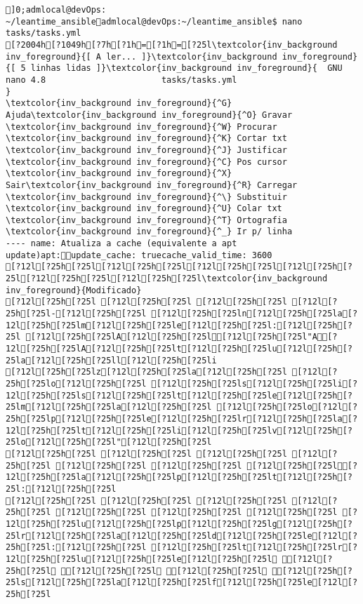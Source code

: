 \documentclass{scrartcl}
\title{}
\begin{document}
\begin{Verbatim}
]0;admlocal@devOps: ~/leantime_ansibleadmlocal@devOps:~/leantime_ansible$ nano tasks/tasks.yml 
[?2004h[?1049h[?7h[?1h=[?1h=[?25l\textcolor{inv_background inv_foreground}{[ A ler... ]}\textcolor{inv_background inv_foreground}{[ 5 linhas lidas ]}\textcolor{inv_background inv_foreground}{  GNU nano 4.8                       tasks/tasks.yml                                   }
\textcolor{inv_background inv_foreground}{^G} Ajuda\textcolor{inv_background inv_foreground}{^O} Gravar     \textcolor{inv_background inv_foreground}{^W} Procurar   \textcolor{inv_background inv_foreground}{^K} Cortar txt \textcolor{inv_background inv_foreground}{^J} Justificar \textcolor{inv_background inv_foreground}{^C} Pos cursor
\textcolor{inv_background inv_foreground}{^X} Sair\textcolor{inv_background inv_foreground}{^R} Carregar   \textcolor{inv_background inv_foreground}{^\} Substituir \textcolor{inv_background inv_foreground}{^U} Colar txt  \textcolor{inv_background inv_foreground}{^T} Ortografia \textcolor{inv_background inv_foreground}{^_} Ir p/ linha
---- name: Atualiza a cache (equivalente a apt update)apt:update_cache: truecache_valid_time: 3600
[?12l[?25h[?25l[?12l[?25h[?25l[?12l[?25h[?25l[?12l[?25h[?25l[?12l[?25h[?25l[?12l[?25h[?25l\textcolor{inv_background inv_foreground}{Modificado}
[?12l[?25h[?25l [?12l[?25h[?25l [?12l[?25h[?25l [?12l[?25h[?25l-[?12l[?25h[?25l [?12l[?25h[?25ln[?12l[?25h[?25la[?12l[?25h[?25lm[?12l[?25h[?25le[?12l[?25h[?25l:[?12l[?25h[?25l [?12l[?25h[?25lA[?12l[?25h[?25l[?12l[?25h[?25l"A[?12l[?25h[?25lA[?12l[?25h[?25lt[?12l[?25h[?25lu[?12l[?25h[?25la[?12l[?25h[?25ll[?12l[?25h[?25li
[?12l[?25h[?25lz[?12l[?25h[?25la[?12l[?25h[?25l [?12l[?25h[?25lo[?12l[?25h[?25l [?12l[?25h[?25ls[?12l[?25h[?25li[?12l[?25h[?25ls[?12l[?25h[?25lt[?12l[?25h[?25le[?12l[?25h[?25lm[?12l[?25h[?25la[?12l[?25h[?25l [?12l[?25h[?25lo[?12l[?25h[?25lp[?12l[?25h[?25le[?12l[?25h[?25lr[?12l[?25h[?25la[?12l[?25h[?25lt[?12l[?25h[?25li[?12l[?25h[?25lv[?12l[?25h[?25lo[?12l[?25h[?25l"[?12l[?25h[?25l
[?12l[?25h[?25l [?12l[?25h[?25l [?12l[?25h[?25l [?12l[?25h[?25l [?12l[?25h[?25l [?12l[?25h[?25l [?12l[?25h[?25l[?12l[?25h[?25la[?12l[?25h[?25lp[?12l[?25h[?25lt[?12l[?25h[?25l:[?12l[?25h[?25l
[?12l[?25h[?25l [?12l[?25h[?25l [?12l[?25h[?25l [?12l[?25h[?25l [?12l[?25h[?25l [?12l[?25h[?25l [?12l[?25h[?25l [?12l[?25h[?25lu[?12l[?25h[?25lp[?12l[?25h[?25lg[?12l[?25h[?25lr[?12l[?25h[?25la[?12l[?25h[?25ld[?12l[?25h[?25le[?12l[?25h[?25l:[?12l[?25h[?25l [?12l[?25h[?25lt[?12l[?25h[?25lr[?12l[?25h[?25lu[?12l[?25h[?25le[?12l[?25h[?25l [?12l[?25h[?25l [?12l[?25h[?25l [?12l[?25h[?25l [?12l[?25h[?25ls[?12l[?25h[?25la[?12l[?25h[?25lf[?12l[?25h[?25le[?12l[?25h[?25l

\end{Verbatim}
\end{document}
